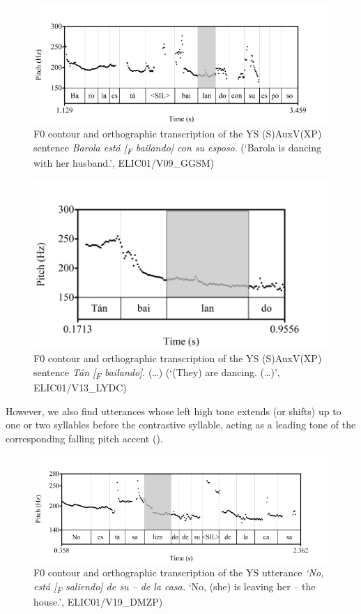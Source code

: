 \documentclass[output=paper]{langsci/langscibook}
\begin{document}
\begin{figure}
\includegraphics[width=\textwidth]{figures/UTH-img27.png}
 \caption{F0 contour and orthographic transcription of the YS (S)AuxV(XP) sentence 
 \textit{Barola está [\textsubscript{F} bailando] con su esposo}. 
 (‘Barola is dancing with her husband.’, ELIC01/V09\_GGSM)}
\label{fig:uth:5}
\end{figure}

\begin{figure}
\includegraphics[width=\textwidth]{figures/UTH-img28.png}
 \caption{F0 contour and orthographic transcription of the YS (S)AuxV(XP) sentence
 \textit{Tán [\textsubscript{F}  bailando]}. (…) 
 (`(They) are dancing. (…)', ELIC01/V13\_LYDC)}
\label{fig:uth:6}
\end{figure}

However, we also find utterances whose left high tone extends (or shifts) up to one or two syllables before the contrastive syllable, acting as a leading tone of the corresponding falling pitch accent (). 

\begin{figure}
\includegraphics[width=\textwidth]{figures/UTH-img29.png}
 \caption{F0 contour and orthographic transcription of the YS utterance
 \textit{‘No, está [\textsubscript{F} saliendo] de su – de la casa.} 
 ‘No, (she) is leaving her – the house.’, ELIC01/V19\_DMZP)}
\label{fig:uth:7}
\end{figure}
\end{document}
